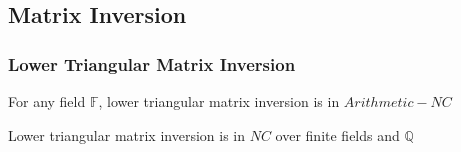 \documentclass[article,10pt]{beamer}%
\newcommand{\bbF}{\mathbb{F}}
\begin{document}
\subsection{Matrix Inversion}
\begin{frame}
\frametitle{Lower Triangular Matrix Inversion}



\begin{theorem}
	For any field $\bbF$, lower triangular matrix inversion is in $Arithmetic-NC$
\end{theorem}\vspace{5mm}

\begin{theorem}
	Lower triangular matrix inversion is in $NC$ over finite fields and $\mathbb{Q}$
\end{theorem}

\end{frame}
\end{document}
